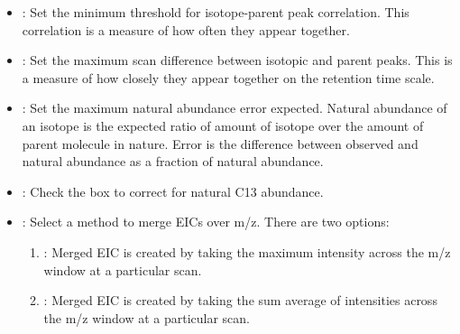 \documentclass[letterpaper,10pt,english,openany,oneside]{sphinxmanual}
\begin{document}
\begin{itemize}
\item {} 
: Set the minimum threshold for isotope-parent peak correlation. This correlation is a measure of how often they appear together.

\item {} 
: Set the maximum scan difference between isotopic and parent peaks. This is a measure of how closely they appear together on the retention time scale.

\item {} 
: Set the maximum natural abundance error expected. Natural abundance of an isotope is the expected ratio of amount of isotope over the amount of parent molecule in nature. Error is the difference between observed and natural abundance as a fraction of natural abundance.

\item {} 
: Check the box to correct for natural C13 abundance.

\end{itemize}


\begin{itemize}
\item {} 
: Select a method to merge EICs over m/z. There are two options:
\begin{enumerate}
\item {} 
: Merged EIC is created by taking the maximum intensity across the m/z window at a particular scan.

\item {} 
: Merged EIC is created by taking the sum average of intensities across the m/z window at a particular scan.

\end{enumerate}

\end{itemize}

\end{document}
